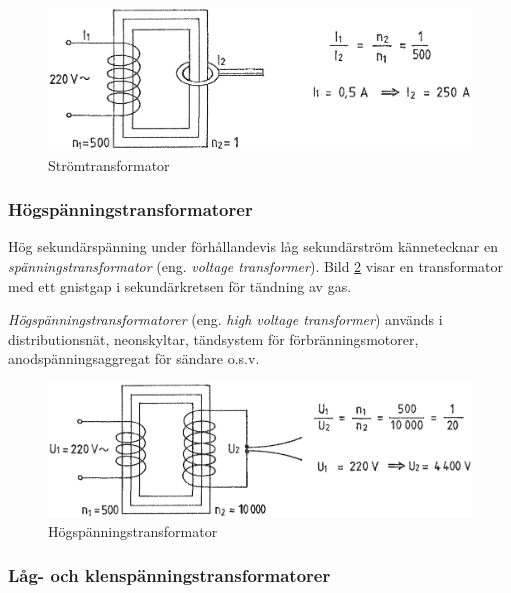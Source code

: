 \begin{figure}[h]
\begin{center}
\includegraphics[width=\textwidth]{images/cropped_pdfs/bild_2_2-09.pdf}
\caption{Strömtransformator}
\label{fig:BildII2-9}
\end{center}
\end{figure}

\subsubsection{Högspänningstransformatorer}

Hög sekundärspänning under förhållandevis låg sekundärström kännetecknar en
\emph{spänningstransformator} (eng. \emph{voltage transformer}).
Bild \ref{fig:BildII2-10} visar en transformator med ett gnistgap i
sekundärkretsen för tändning av gas.

\emph{Högspänningstransformatorer} (eng. \emph{high voltage transformer})
används i distributionsnät, neonskyltar, tändsystem för förbränningsmotorer,
anodspänningsaggregat för sändare o.s.v.

\begin{figure}[h]
\begin{center}
\includegraphics[width=\textwidth]{images/cropped_pdfs/bild_2_2-10.pdf}
\caption{Högspänningstransformator}
\label{fig:BildII2-10}
\end{center}
\end{figure}

\subsubsection{Låg- och klenspänningstransformatorer}

